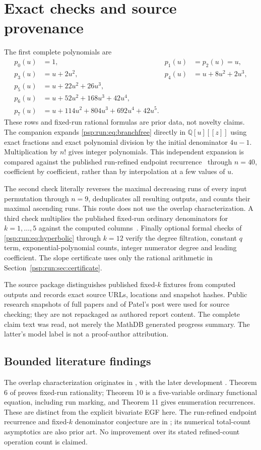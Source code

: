 \documentclass[11pt,letterpaper]{article}
\numberwithin{equation}{section}
\theoremstyle{remark}\newtheorem{remark}[theorem]{Remark}
\newcommand{\QQ}{\mathbb Q}
\begin{document}
\section{Exact checks and source provenance}\label{psp:run:sec:checks}
The first complete polynomials are
\begin{align*}
 p_0(u)&=1,&p_1(u)&=p_2(u)=u,\\
 p_3(u)&=u+2u^2,&p_4(u)&=u+8u^2+2u^3,\\
 p_5(u)&=u+22u^2+26u^3,\\
 p_6(u)&=u+52u^2+168u^3+42u^4,\\
 p_7(u)&=u+114u^2+804u^3+692u^4+42u^5.
\end{align*}
These rows and fixed-run rational formulas are prior data, not novelty
claims. The companion expands \eqref{psp:run:eq:branchfree} directly in
$\QQ[u][[z]]$ using exact fractions and exact polynomial division by
the initial denominator $4u-1$. Multiplication by $n!$ gives integer
polynomials. This independent expansion is compared against the
published run-refined endpoint recurrence~\cite[Eq. (3)]{cgp} through
$n=40$, coefficient by coefficient, rather than by interpolation at a
few values of $u$.

The second check literally reverses the maximal decreasing runs of
every input permutation through $n=9$, deduplicates all resulting
outputs, and counts their maximal ascending runs. This route does not
use the overlap characterization. A third check multiplies the
published fixed-run ordinary denominators for $k=1,\ldots,5$ against
the computed columns~\cite[pp. 10--11]{abh}. Finally optional formal
checks of \eqref{psp:run:eq:hyperbolic} through $k=12$ verify the degree
filtration, constant $q$ term, exponential-polynomial counts, integer
numerator degree and leading coefficient. The slope certificate uses
only the rational arithmetic in Section~\ref{psp:run:sec:certificate}.

The source package distinguishes published fixed-$k$ fixtures from
computed outputs and records exact source URLs, locations and snapshot
hashes. Public research snapshots of full papers and of Patel's post
were used for source checking; they are not repackaged as authored
report content. The complete claim text was read, not merely the
MathDB generated progress summary. The latter's model label is not
a proof-author attribution.

\subsection{Bounded literature findings}
The overlap characterization originates in \cite{abbhl}, with the later
development \cite{abh}. Theorem 6 of \cite{abh} proves fixed-run
rationality; Theorem 10 is a five-variable ordinary functional equation,
including run marking, and Theorem 11 gives enumeration recurrences.
These are distinct from the explicit bivariate EGF here. The run-refined
endpoint recurrence and fixed-$k$ denominator conjecture are in
\cite{cgp}; its numerical total-count asymptotics are also prior art.
No improvement over its stated refined-count operation count is claimed.
\end{document}
